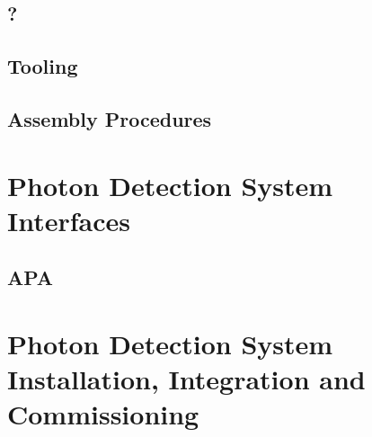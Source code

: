 \subsection{}
\label{sec:fddp-pd-?}

\subsection{?}
\label{sec:fddp-pd-??}


\subsection{Tooling}
\label{sec:fddp-pd-tooling}


\subsection{Assembly Procedures}
\label{sec:fddp-pd-assy}



\section{Photon Detection System Interfaces}
\label{sec:fddp-pd-intfc}



\subsection{APA}
\label{sec:fddp-pd-intfc-apa}


\subsection{}
\label{sec:fddp-pd-intfc-?}


\section{Photon Detection System Installation, Integration and Commissioning}
\label{sec:fddp-pd-install}

